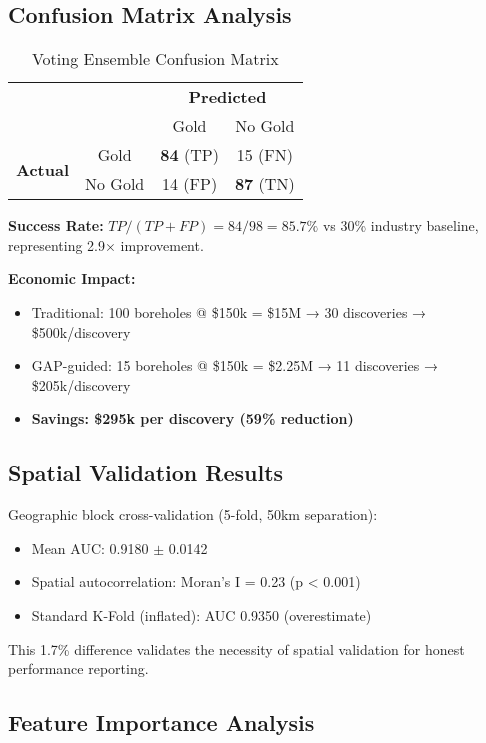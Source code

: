 \documentclass[12pt,a4paper]{article}
\begin{document}
\subsection{Confusion Matrix Analysis}

\begin{table}[h]
\centering
\caption{Voting Ensemble Confusion Matrix}
\label{tab:confusion}
\begin{tabular}{cc|cc}
\multicolumn{2}{c}{} & \multicolumn{2}{c}{\textbf{Predicted}} \\
& & Gold & No Gold \\
\hline
\multirow{2}{*}{\textbf{Actual}}
& Gold & \textbf{84} (TP) & 15 (FN) \\
& No Gold & 14 (FP) & \textbf{87} (TN) \\
\end{tabular}
\end{table}

\textbf{Success Rate:} $TP/(TP+FP) = 84/98 = 85.7\%$ vs 30\% industry baseline, representing 2.9$\times$ improvement.

\textbf{Economic Impact:}
\begin{itemize}
    \item Traditional: 100 boreholes @ \$150k = \$15M → 30 discoveries → \$500k/discovery
    \item GAP-guided: 15 boreholes @ \$150k = \$2.25M → 11 discoveries → \$205k/discovery
    \item \textbf{Savings: \$295k per discovery (59\% reduction)}
\end{itemize}

\subsection{Spatial Validation Results}

Geographic block cross-validation (5-fold, 50km separation):
\begin{itemize}
    \item Mean AUC: 0.9180 $\pm$ 0.0142
    \item Spatial autocorrelation: Moran's I = 0.23 (p < 0.001)
    \item Standard K-Fold (inflated): AUC 0.9350 (overestimate)
\end{itemize}

This 1.7\% difference validates the necessity of spatial validation for honest performance reporting.

\subsection{Feature Importance Analysis}
\end{document}
